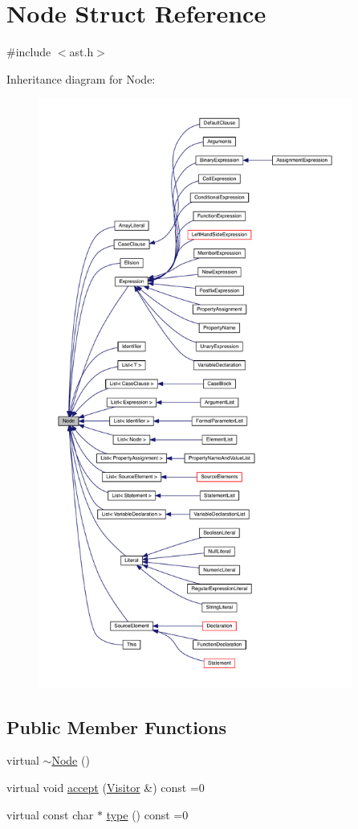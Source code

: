 \hypertarget{struct_node}{}\section{Node Struct Reference}
\label{struct_node}


{\ttfamily \#include $<$ast.\+h$>$}



Inheritance diagram for Node\+:\nopagebreak
\begin{figure}[H]
\begin{center}
\leavevmode
\includegraphics[height=550pt]{struct_node__inherit__graph}
\end{center}
\end{figure}
\subsection*{Public Member Functions}
\begin{DoxyCompactItemize}
\item 
virtual \hyperlink{struct_node_af5e3fa79300bf5f3f2f3ecae6e795a94}{$\sim$\+Node} ()
\item 
virtual void \hyperlink{struct_node_a10bd7af968140bbf5fa461298a969c71}{accept} (\hyperlink{struct_visitor}{Visitor} \&) const =0
\item 
virtual const char $\ast$ \hyperlink{struct_node_a82f29420d0a38efcc370352528e94e9b}{type} () const =0
\end{DoxyCompactItemize}


